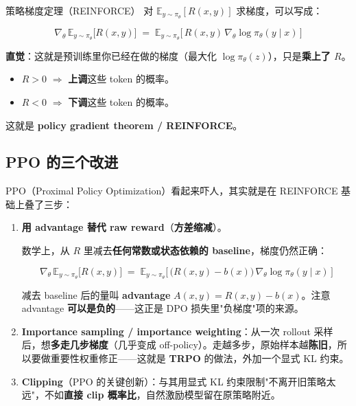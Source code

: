 \documentclass[a4paper]{article}
\begin{document}
\begin{knowledgebox}{策略梯度定理（REINFORCE）}
对 $\mathbb{E}_{y\sim\pi_\theta}[R(x,y)]$ 求梯度，可以写成：

\[
\nabla_\theta\,\mathbb{E}_{y\sim\pi_\theta}\big[R(x,y)\big]
\;=\; \mathbb{E}_{y\sim\pi_\theta}\!\Big[\,R(x,y)\,\nabla_\theta \log \pi_\theta(y\mid x)\,\Big]
\]

\textbf{直觉}：这就是预训练里你已经在做的梯度（最大化 $\log \pi_\theta(z)$），只是\textbf{乘上了 $R$}。

\begin{itemize}
\item $R > 0$ $\Rightarrow$ \textbf{上调}这些 token 的概率。
\item $R < 0$ $\Rightarrow$ \textbf{下调}这些 token 的概率。
\end{itemize}

这就是 \textbf{policy gradient theorem / REINFORCE}。
\end{knowledgebox}

\subsection{PPO 的三个改进}

PPO（Proximal Policy Optimization）看起来吓人，其实就是在 REINFORCE 基础上叠了三步：

\begin{enumerate}
\item \textbf{用 advantage 替代 raw reward}（\textbf{方差缩减}）。

数学上，从 $R$ 里减去\textbf{任何常数或状态依赖的 baseline}，梯度仍然正确：

\[
\nabla_\theta\,\mathbb{E}_{y\sim\pi_\theta}\big[R(x,y)\big]
\;=\; \mathbb{E}_{y\sim\pi_\theta}\!\Big[\,\big(R(x,y)-b(x)\big)\,\nabla_\theta \log \pi_\theta(y\mid x)\,\Big]
\]

减去 baseline 后的量叫 \textbf{advantage} $A(x,y) = R(x,y) - b(x)$。注意 advantage \textbf{可以是负的}——这正是 DPO 损失里"负梯度"项的来源。

\item \textbf{Importance sampling / importance weighting}：从一次 rollout 采样后，想\textbf{多走几步梯度}（几乎变成 off-policy）。走越多步，原始样本越\textbf{陈旧}，所以要做重要性权重修正——这就是 \textbf{TRPO} 的做法，外加一个显式 KL 约束。

\item \textbf{Clipping}（PPO 的关键创新）：与其用显式 KL 约束限制"不离开旧策略太远"，不如\textbf{直接 clip 概率比}，自然激励模型留在原策略附近。
\end{enumerate}
\end{document}
